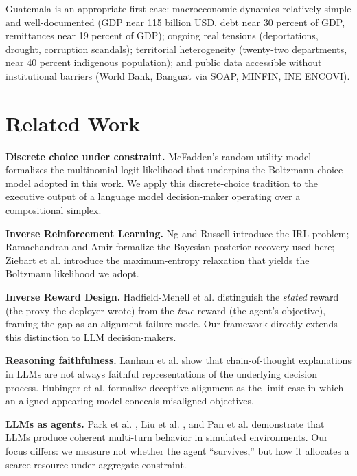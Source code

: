\documentclass[conference]{IEEEtran}
\begin{document}
Guatemala is an appropriate first case: macroeconomic dynamics
relatively simple and well-documented (GDP near 115 billion USD, debt
near 30 percent of GDP, remittances near 19 percent of GDP); ongoing
real tensions (deportations, drought, corruption scandals); territorial
heterogeneity (twenty-two departments, near 40 percent indigenous
population); and public data accessible without institutional barriers
(World Bank, Banguat via SOAP, MINFIN, INE ENCOVI).

\section{Related Work}

\textbf{Discrete choice under constraint.} McFadden's random utility
model \cite{mcfadden1974} formalizes the multinomial logit likelihood
that underpins the Boltzmann choice model adopted in this work. We
apply this discrete-choice tradition to the executive output of a
language model decision-maker operating over a compositional simplex.

\textbf{Inverse Reinforcement Learning.} Ng and Russell
\cite{ng2000irl} introduce the IRL problem; Ramachandran and Amir
\cite{ramachandran2007} formalize the Bayesian posterior recovery used
here; Ziebart et al. \cite{ziebart2008} introduce the maximum-entropy
relaxation that yields the Boltzmann likelihood we adopt.

\textbf{Inverse Reward Design.} Hadfield-Menell et al.
\cite{hadfield2017} distinguish the \emph{stated} reward (the proxy
the deployer wrote) from the \emph{true} reward (the agent's
objective), framing the gap as an alignment failure mode. Our
framework directly extends this distinction to LLM decision-makers.

\textbf{Reasoning faithfulness.} Lanham et al. \cite{lanham2023} show
that chain-of-thought explanations in LLMs are not always faithful
representations of the underlying decision process. Hubinger et al.
\cite{hubinger2024} formalize deceptive alignment as the limit case in
which an aligned-appearing model conceals misaligned objectives.

\textbf{LLMs as agents.} Park et al. \cite{park2023}, Liu et al.
\cite{liu2023}, and Pan et al. \cite{pan2023} demonstrate that LLMs
produce coherent multi-turn behavior in simulated environments. Our
focus differs: we measure not whether the agent ``survives,'' but how
it allocates a scarce resource under aggregate constraint.
\end{document}
